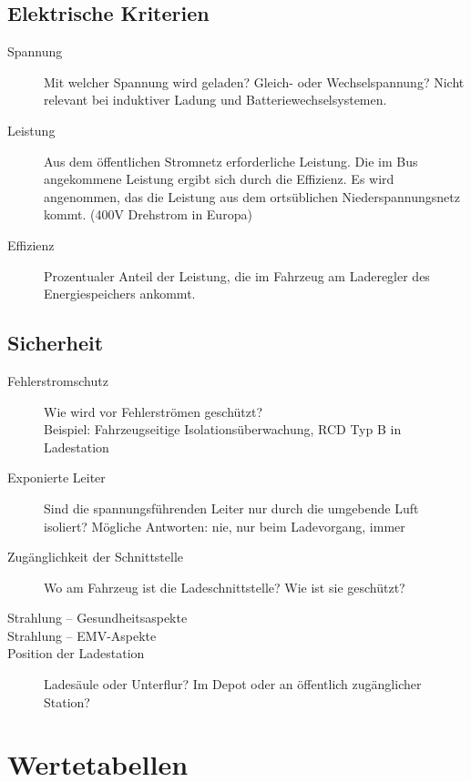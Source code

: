 \subsection{Elektrische Kriterien}
\begin{description}
	\item [Spannung]
	Mit welcher Spannung wird geladen? Gleich- oder Wechselspannung? Nicht relevant bei induktiver Ladung und Batteriewechselsystemen.
	\item [Leistung]
	Aus dem öffentlichen Stromnetz erforderliche Leistung. Die im Bus angekommene Leistung ergibt sich durch die Effizienz. Es wird angenommen, das die Leistung aus dem ortsüblichen Niederspannungsnetz kommt. (400V Drehstrom in Europa)
	\item [Effizienz]
	Prozentualer Anteil der Leistung, die im Fahrzeug am Laderegler des Energiespeichers ankommt.		
\end{description}

\subsection{Sicherheit}
\begin{description}
	\item [Fehlerstromschutz]
	Wie wird vor Fehlerströmen geschützt?\\
	Beispiel: Fahrzeugseitige Isolationsüberwachung, RCD Typ B in Ladestation
	\item [Exponierte Leiter]
	Sind die spannungsführenden Leiter nur durch die umgebende Luft isoliert? Mögliche Antworten: nie, nur beim Ladevorgang, immer
	\item [Zugänglichkeit der Schnittstelle]
	Wo am Fahrzeug ist die Ladeschnittstelle? Wie ist sie geschützt?
	\item [Strahlung – Gesundheitsaspekte]
	\item [Strahlung – EMV-Aspekte]
	\item [Position der Ladestation]
	Ladesäule oder Unterflur? Im Depot oder an öffentlich zugänglicher Station?	
\end{description}


\section{Wertetabellen}
\label{sec_tabellen_ladesysteme}